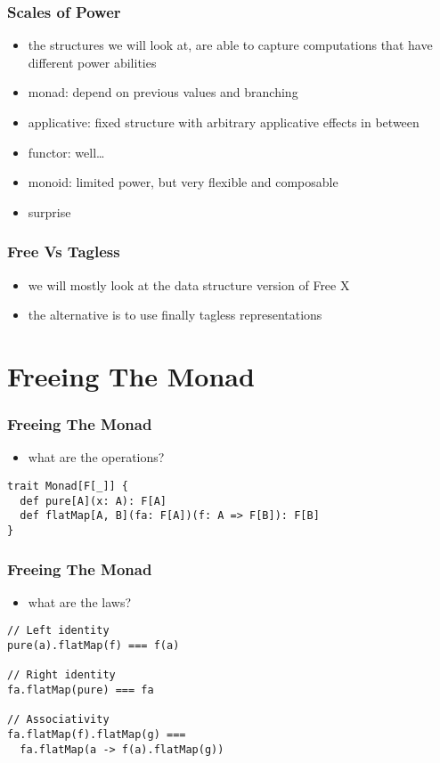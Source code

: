 \documentclass{beamer}
\begin{document}
\begin{frame}
  \frametitle{Scales of Power}
  \begin{itemize}
  \item the structures we will look at, are able to capture computations that have different power abilities
  \item monad: depend on previous values and branching
  \item applicative: fixed structure with arbitrary applicative effects in between
  \item functor: well\ldots
  \item monoid: limited power, but very flexible and composable
  \item surprise
  \end{itemize}
\end{frame}

\begin{frame}
  \frametitle{Free Vs Tagless}
  \begin{itemize}
  \item we will mostly look at the data structure version of Free X
  \item the alternative is to use finally tagless representations
  \end{itemize}
\end{frame}

\section{Freeing The Monad}\label{sec:free-monad}
\begin{frame}[fragile]
  \frametitle{Freeing The Monad}
  \begin{itemize}
  \item what are the operations?
  \end{itemize}
    \begin{center}
\begin{verbatim}
trait Monad[F[_]] {
  def pure[A](x: A): F[A]
  def flatMap[A, B](fa: F[A])(f: A => F[B]): F[B]
}
\end{verbatim}
\end{center}
\end{frame}

\begin{frame}[fragile]
  \frametitle{Freeing The Monad}
\begin{itemize}
  \item what are the laws?
\end{itemize}
    \begin{center}
\begin{verbatim}
// Left identity
pure(a).flatMap(f) === f(a)

// Right identity
fa.flatMap(pure) === fa

// Associativity
fa.flatMap(f).flatMap(g) ===
  fa.flatMap(a -> f(a).flatMap(g))
\end{verbatim}
    \end{center}
\end{frame}
\end{document}
